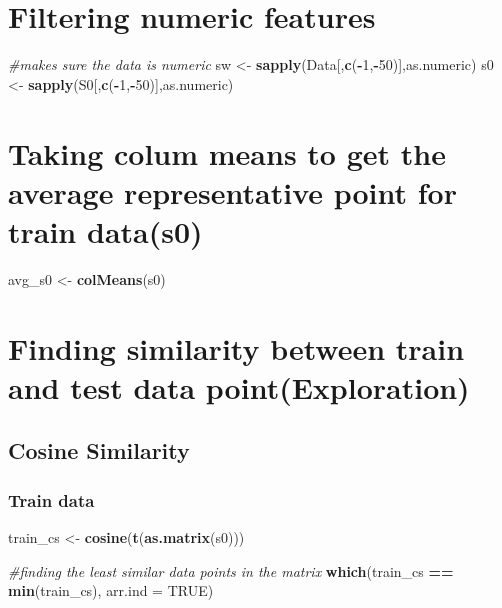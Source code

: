 \documentclass[]{article}
\newenvironment{Shaded}{\begin{snugshade}}{\end{snugshade}}
\newcommand{\KeywordTok}[1]{\textcolor[rgb]{0.13,0.29,0.53}{\textbf{#1}}}
\newcommand{\DataTypeTok}[1]{\textcolor[rgb]{0.13,0.29,0.53}{#1}}
\newcommand{\DecValTok}[1]{\textcolor[rgb]{0.00,0.00,0.81}{#1}}
\newcommand{\StringTok}[1]{\textcolor[rgb]{0.31,0.60,0.02}{#1}}
\newcommand{\CommentTok}[1]{\textcolor[rgb]{0.56,0.35,0.01}{\textit{#1}}}
\newcommand{\OtherTok}[1]{\textcolor[rgb]{0.56,0.35,0.01}{#1}}
\newcommand{\OperatorTok}[1]{\textcolor[rgb]{0.81,0.36,0.00}{\textbf{#1}}}
\newcommand{\NormalTok}[1]{#1}
\begin{document}
\section{Filtering numeric features}\label{filtering-numeric-features}

\begin{Shaded}
\begin{Highlighting}[]
\CommentTok{#makes sure the data is numeric}
\NormalTok{sw <-}\StringTok{ }\KeywordTok{sapply}\NormalTok{(Data[,}\KeywordTok{c}\NormalTok{(}\OperatorTok{-}\DecValTok{1}\NormalTok{,}\OperatorTok{-}\DecValTok{50}\NormalTok{)],as.numeric)}
\NormalTok{s0 <-}\StringTok{ }\KeywordTok{sapply}\NormalTok{(S0[,}\KeywordTok{c}\NormalTok{(}\OperatorTok{-}\DecValTok{1}\NormalTok{,}\OperatorTok{-}\DecValTok{50}\NormalTok{)],as.numeric)}
\end{Highlighting}
\end{Shaded}

\section{Taking colum means to get the average representative point for
train
data(s0)}\label{taking-colum-means-to-get-the-average-representative-point-for-train-datas0}

\begin{Shaded}
\begin{Highlighting}[]
\NormalTok{avg_s0 <-}\StringTok{ }\KeywordTok{colMeans}\NormalTok{(s0)}
\end{Highlighting}
\end{Shaded}

\section{Finding similarity between train and test data
point(Exploration)}\label{finding-similarity-between-train-and-test-data-pointexploration}

\subsection{Cosine Similarity}\label{cosine-similarity}

\subsubsection{Train data}\label{train-data}

\begin{Shaded}
\begin{Highlighting}[]
\NormalTok{train_cs <-}\StringTok{ }\KeywordTok{cosine}\NormalTok{(}\KeywordTok{t}\NormalTok{(}\KeywordTok{as.matrix}\NormalTok{(s0)))}

\CommentTok{#finding the least similar data points in the matrix}
\KeywordTok{which}\NormalTok{(train_cs }\OperatorTok{==}\StringTok{ }\KeywordTok{min}\NormalTok{(train_cs), }\DataTypeTok{arr.ind =} \OtherTok{TRUE}\NormalTok{)}
\end{Highlighting}
\end{Shaded}
\end{document}
